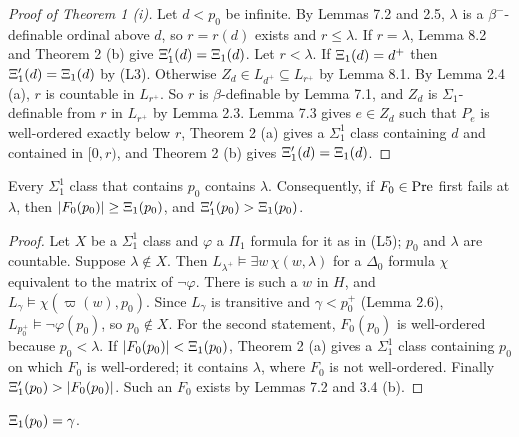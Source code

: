 \documentclass[11pt]{article}
\begin{document}
\begin{proof}[Proof of Theorem 1 (i)] Let $d < p_0$ be infinite. By Lemmas 7.2 and 2.5, $\lambda$ is a
$\beta^-$-definable ordinal above $d$, so $r = r(d)$ exists and $r \le \lambda$. If $r = \lambda$, Lemma 8.2 and Theorem 2 (b)
give $\Xi'_1(d) = \Xi_1(d)$. Let $r < \lambda$. If $\Xi_1(d) = d^+$ then $\Xi'_1(d) = \Xi_1(d)$ by (L3). Otherwise
$Z_d \in L_{d^+} \subseteq L_{r^+}$ by Lemma 8.1. By Lemma 2.4 (a), $r$ is countable in $L_{r^+}$. So $r$ is
$\beta$-definable by Lemma 7.1, and $Z_d$ is $\Sigma_1$-definable from $r$ in $L_{r^+}$ by Lemma 2.3. Lemma 7.3
gives $e \in Z_d$ such that $P_e$ is well-ordered exactly below $r$, Theorem 2 (a) gives a $\Sigma^1_1$ class
containing $d$ and contained in $[0, r)$, and Theorem 2 (b) gives $\Xi'_1(d) = \Xi_1(d)$.
\end{proof}

\begin{statement} Every $\Sigma^1_1$ class that contains $p_0$ contains $\lambda$. Consequently, if
$F_0 \in \mathrm{Pre}$ first fails at $\lambda$, then $|F_0(p_0)| \ge \Xi_1(p_0)$, and $\Xi'_1(p_0) > \Xi_1(p_0)$.
\end{statement}

\begin{proof} Let $X$ be a $\Sigma^1_1$ class and $\varphi$ a $\Pi_1$ formula for it as in (L5); $p_0$ and $\lambda$
are countable. Suppose $\lambda \notin X$. Then $L_{\lambda^+} \models \exists w\, \chi(w, \lambda)$ for a $\Delta_0$ formula $\chi$
equivalent to the matrix of $\neg\varphi$. There is such a $w$ in $H$, and $L_{\gamma} \models \chi(\varpi(w), p_0)$.
Since $L_{\gamma}$ is transitive and $\gamma < p_0^+$ (Lemma 2.6), $L_{p_0^+} \models \neg\varphi(p_0)$, so
$p_0 \notin X$. For the second statement, $F_0(p_0)$ is well-ordered because $p_0 < \lambda$. If
$|F_0(p_0)| < \Xi_1(p_0)$, Theorem 2 (a) gives a $\Sigma^1_1$ class containing $p_0$ on which $F_0$ is
well-ordered; it contains $\lambda$, where $F_0$ is not well-ordered. Finally $\Xi'_1(p_0) > |F_0(p_0)|$. Such an $F_0$
exists by Lemmas 7.2 and 3.4 (b).
\end{proof}

\begin{statement} $\Xi_1(p_0) = \gamma$.
\end{statement}
\end{document}
